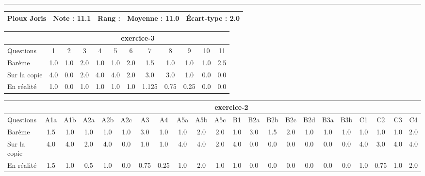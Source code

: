 \documentclass[a4paper, landscape, 10pt]{article}
\begin{document}
\begin{minipage}{\textwidth}
  \end{minipage}
  \vspace{0.3cm}
  \hrule
  \vspace{0.3cm}

  \begin{minipage}{\textwidth}
    { \bf
    \begin{tabular}{|c|*{4}{c|}}
    \hline
      Ploux Joris & Note : 11.1 & Rang :  & Moyenne : 11.0 & \'Ecart-type : 2.0 \\
    \hline
    \end{tabular}
    }
    
      \begin{tabular}{|l|*{ 11 }{c|}}
        \hline
        & \multicolumn{ 11 }{c|}{ exercice-3 } \\
        \hline
        Questions & 1&2&3&4&5&6&7&8&9&10&11 \\
        \hline
        Barème & 1.0&1.0&2.0&1.0&1.0&2.0&1.5&1.0&1.0&1.0&2.5 \\
        \hline
        Sur la copie & 4.0&0.0&2.0&4.0&4.0&2.0&3.0&3.0&1.0&0.0&0.0 \\
        \hline
        En réalité & 1.0&0.0&1.0&1.0&1.0&1.0&1.125&0.75&0.25&0.0&0.0 \\
        \hline
      \end{tabular}
    
      \begin{tabular}{|l|*{ 21 }{c|}}
        \hline
        & \multicolumn{ 21 }{c|}{ exercice-2 } \\
        \hline
        Questions & A1a&A1b&A2a&A2b&A2c&A3&A4&A5a&A5b&A5c&B1&B2a&B2b&B2c&B2d&B3a&B3b&C1&C2&C3&C4 \\
        \hline
        Barème & 1.5&1.0&1.0&1.0&1.0&3.0&1.0&1.0&2.0&2.0&1.0&3.0&1.5&2.0&1.0&1.0&1.0&1.0&1.0&1.0&2.0 \\
        \hline
        Sur la copie & 4.0&4.0&2.0&4.0&0.0&1.0&1.0&4.0&4.0&2.0&4.0&0.0&0.0&0.0&0.0&0.0&0.0&4.0&3.0&4.0&4.0 \\
        \hline
        En réalité & 1.5&1.0&0.5&1.0&0.0&0.75&0.25&1.0&2.0&1.0&1.0&0.0&0.0&0.0&0.0&0.0&0.0&1.0&0.75&1.0&2.0 \\
        \hline
      \end{tabular}
    

\end{minipage}
\end{document}
